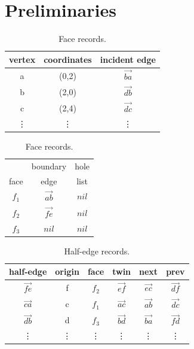 \section{Preliminaries}

\begin{table} %
    \ssp
    \begin{minipage}{0.5\textwidth}
        \small
        \centering
        \caption{Vertex records.}\label{tab:vertices}
        \begin{tabular}{c c c}
            \toprule
            vertex & coordinates & incident edge \\
            \midrule
            a      & (0,2)  & $\vec{ba}$ \\
            b      & (2,0)  & $\vec{db}$ \\
            c      & (2,4)  & $\vec{dc}$ \\
            \vdots & \vdots & \vdots     \\
            \bottomrule
        \end{tabular}
    \end{minipage}\hfill %
    \begin{minipage}{0.5\textwidth}
        \small
        \centering
        \caption{Face records.}\label{tab:faces}
        \begin{tabular}{c c c}
            \toprule
                & boundary  & hole\\
            face & edge      & list\\
            \midrule
            $f_1$ & $\vec{ab}$ & $nil$ \\
            $f_2$ & $\vec{fe}$ & $nil$ \\
            $f_3$ & $nil$      & $nil$ \\
            \bottomrule
        \end{tabular}
    \end{minipage}
\end{table}

\begin{table}
    \ssp
    \small
    \centering
    \caption{Half-edge records.}\label{tab:hedges}
    \begin{tabular}{c c c c c c} 
        \toprule
        half-edge & origin & face & twin & next & prev \\
        \midrule
        $\vec{fe}$ & f & $f_2$  & $\vec{ef}$ & $\vec{ec}$ & $\vec{df}$ \\
        $\vec{ca}$ & c & $f_1$  & $\vec{ac}$ & $\vec{ab}$ & $\vec{dc}$ \\
        $\vec{db}$ & d & $f_3$  & $\vec{bd}$ & $\vec{ba}$ & $\vec{fd}$ \\
        \vdots     & \vdots & \vdots & \vdots     & \vdots     & \vdots     \\
        \bottomrule
    \end{tabular}
\end{table}

